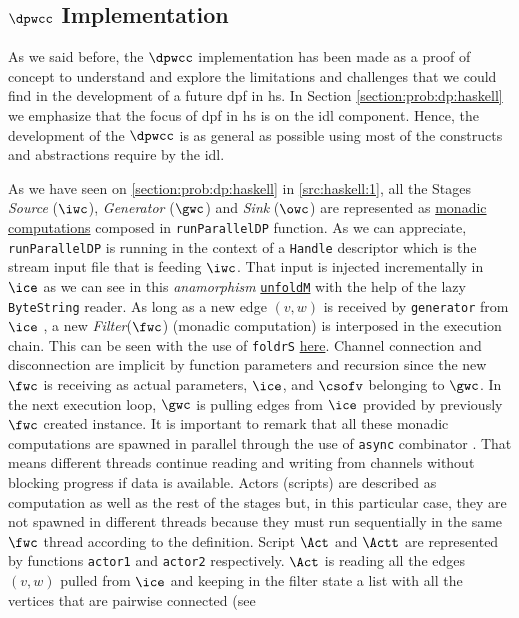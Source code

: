 \subsection{$\dpwcc$  Implementation}
%
As we said before, the  $\dpwcc$ implementation has been made as a proof of concept to understand and explore the limitations and challenges that we could find in the development of a future  \acrshort{dpf} in \acrshort{hs}. In Section \ref{section:prob:dp:haskell} we emphasize that the focus of \acrshort{dpf} in \acrshort{hs} is on the \acrshort{idl} component. Hence, the development of the $\dpwcc$ is as general as possible using most of the constructs and abstractions require by the  \acrshort{idl}.

As we have seen on \autoref{section:prob:dp:haskell} in \autoref{src:haskell:1}, all the Stages \textit{Source} ($\iwc$),  \textit{Generator} ($\gwc$) and \textit{Sink} ($\owc$) are represented as \href{https://github.com/jproyo/upc-miri-tfm/blob/17ee929f64a8be8a88ced782bfcf6bf355d8580a/connected-comp/src/ConnComp/Internal.hs#L20-L27}{monadic computations} composed in \texttt{runParallelDP} function. As we can appreciate, \texttt{runParallelDP} is running in the context of a \texttt{Handle} descriptor which is the stream input file that is feeding $\iwc$. That input is injected incrementally in $\ice$ as we can see in this \emph{anamorphism} \href{https://github.com/jproyo/upc-miri-tfm/blob/17ee929f64a8be8a88ced782bfcf6bf355d8580a/connected-comp/src/ConnComp/Internal.hs#L84-L85}{\texttt{unfoldM}} with the help of the lazy \texttt{ByteString} reader. As long as a new edge $(v,w)$ is received by \texttt{generator}  from $\ice$ , a new \textit{Filter}($\fwc$) (monadic computation) is interposed in the execution chain. This can be seen with the use of \texttt{foldrS}  \href{https://github.com/jproyo/upc-miri-tfm/blob/17ee929f64a8be8a88ced782bfcf6bf355d8580a/connected-comp/src/ConnComp/Internal.hs#L35-L41}{here}. Channel connection and disconnection are implicit by function parameters and recursion since the new $\fwc$ is receiving as actual parameters, $\ice$, and $\csofv$ belonging to $\gwc$. In the next execution loop, $\gwc$ is pulling edges from $\ice$ provided by previously $\fwc$ created instance. It is important to remark that all these monadic computations are spawned in parallel through the use of \texttt{async} combinator \cite{async}. That means different threads continue reading and writing from channels without blocking progress if data is available. Actors (scripts) are described as computation as well as the rest of the stages but, in this particular case, they are not spawned in different threads because they must run sequentially in the same $\fwc$ thread according to the definition. Script $\Act$ and $\Actt$ are represented by functions \texttt{actor1} and \texttt{actor2} respectively. $\Act$ is reading all the edges $(v,w)$ pulled from $\ice$ and keeping in the filter state a list with all the vertices that are pairwise connected (see 